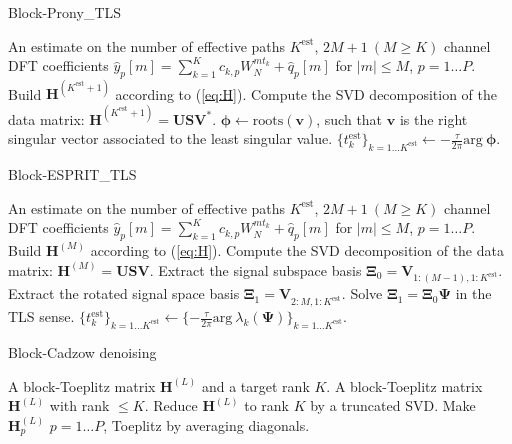 \documentclass[journal,10pt]{IEEEtran}
\providecommand{\mat}[1]{\boldsymbol{#1}}
\providecommand{\vct}[1]{\boldsymbol{#1}}
\begin{document}
\begin{algorithm}[t]
\caption{Block-Prony\_TLS}
\begin{algorithmic}[1]
\REQUIRE An estimate on the number of effective paths $K^{\text{est}}$, $2M+1\ (M\geq K)$ channel DFT coefficients $\widehat y_p[m]=\sum_{k=1}^K c_{k,p}W_N^{mt_k}+ \widehat q_p[m]$ for $|m|\leq M$, $p=1\dots P$.
\STATE Build $\mat H^{(K^{\text{est}}+1)}$ according to (\ref{eq:H}).
\STATE Compute the SVD decomposition of the data matrix: $\mat H^{(K^{\text{est}}+1)}=\mat U\mat S\mat V^\ast$.
\STATE $\vct \phi \leftarrow\text{roots}(\vct v)$, such that $\vct v$ is the right singular vector associated to the least singular value.
\RETURN $\lbrace t_k^{\text{est}}\rbrace_{k=1\dots K^{\text{est}}} \leftarrow -\frac{\tau}{2\pi}\text{arg}\:\vct\phi$.
\end{algorithmic}\label{algo:prony}
\end{algorithm}
\begin{algorithm}[t]
\caption{Block-ESPRIT\_TLS}
\begin{algorithmic}[1]
\REQUIRE An estimate on the number of effective paths $K^{\text{est}}$, $2M+1\ (M\geq K)$ channel DFT coefficients $\widehat y_p[m]=\sum_{k=1}^K c_{k,p}W_N^{mt_k}+ \widehat q_p[m]$ for $|m|\leq M$, $p=1\dots P$.
\STATE Build $\mat H^{(M)}$ according to (\ref{eq:H}).
\STATE Compute the SVD decomposition of the data matrix: $\mat H^{(M)}=\mat U\mat S\mat V$.
\STATE Extract the signal subspace basis $\mat\Xi_0=\mat V_{1:(M-1),1:K^{\text{est}}}$.
\STATE Extract the rotated signal space basis $\mat\Xi_1=\mat V_{2:M,1:K^{\text{est}}}$.
\STATE Solve $\mat \Xi_1=\mat\Xi_0\mat\Psi$ in the TLS sense.
\RETURN $\lbrace t_k^{\text{est}}\rbrace_{k=1\dots K^{\text{est}}} \leftarrow \lbrace -\frac{\tau}{2\pi}\text{arg}\:\lambda_k\left(\mat\Psi\right)\rbrace_{k=1\dots K^{\text{est}}}$.
\end{algorithmic}\label{algo:esprit}
\end{algorithm}
\begin{algorithm}[t!]
\caption{Block-Cadzow denoising}
\begin{algorithmic}[1]
\REQUIRE A block-Toeplitz matrix $\mat H^{(L)}$ and a target rank $K$.
\ENSURE  A block-Toeplitz matrix $\mat H^{(L)}$ with rank $\leq K$.
\REPEAT
\STATE Reduce $\mat H^{(L)}$ to rank $K$ by a truncated SVD.
\STATE Make $\mat H_p^{(L)}$ $p=1\dots P$, Toeplitz by averaging diagonals.
\end{algorithmic}\label{algo:blockcadzow}
\end{algorithm}
\end{document}
